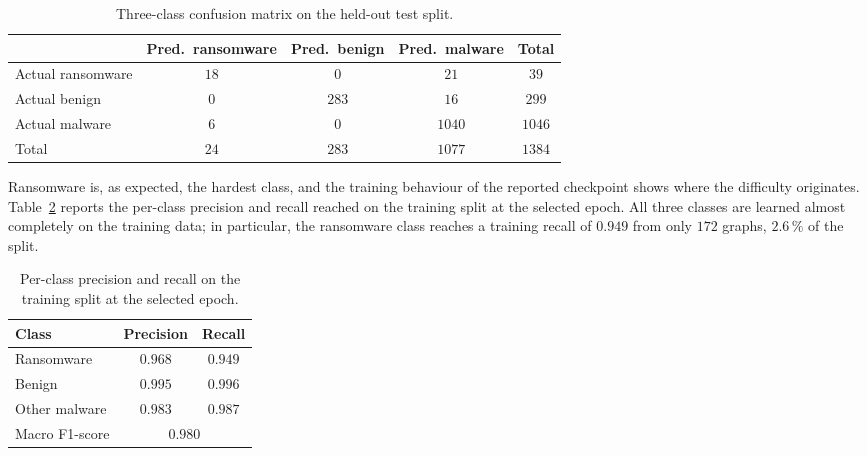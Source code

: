 \documentclass[%
    BCOR=10mm,
    DIV=13,
    toc=bibliography,
    toc=listof,
    oneside,
    12pt,
]{scrbook}
\begin{document}
\begin{table}[H]
\centering
\small
\caption{Three-class confusion matrix on the held-out test split.}
\label{tab:threeclass_confusion}
\begin{tabular}{l ccc c}
\toprule
 & \textbf{Pred.\ ransomware} & \textbf{Pred.\ benign} & \textbf{Pred.\ malware} & \textbf{Total} \\
\midrule
Actual ransomware & $18$ & $0$   & $21$   & $39$   \\
Actual benign     & $0$  & $283$ & $16$   & $299$  \\
Actual malware    & $6$  & $0$   & $1040$ & $1046$ \\
\midrule
Total             & $24$ & $283$ & $1077$ & $1384$ \\
\bottomrule
\end{tabular}
\end{table}

Ransomware is, as expected, the hardest class, and the training behaviour of
the reported checkpoint shows where the difficulty originates.
Table~\ref{tab:selected_epoch_metrics} reports the per-class precision and
recall reached on the training split at the selected epoch. All three classes
are learned almost completely on the training data; in particular, the
ransomware class reaches a training recall of $0.949$ from only $172$ graphs,
$2.6\,\%$ of the split.

\begin{table}[htbp]
\centering
\small
\caption{Per-class precision and recall on the training split at the selected
epoch.}
\label{tab:selected_epoch_metrics}
\begin{tabular}{l cc}
\toprule
\textbf{Class} & \textbf{Precision} & \textbf{Recall} \\
\midrule
Ransomware    & $0.968$ & $0.949$ \\
Benign        & $0.995$ & $0.996$ \\
Other malware & $0.983$ & $0.987$ \\
\midrule
Macro F1-score & \multicolumn{2}{c}{$0.980$} \\
\bottomrule
\end{tabular}
\end{table}
\end{document}
